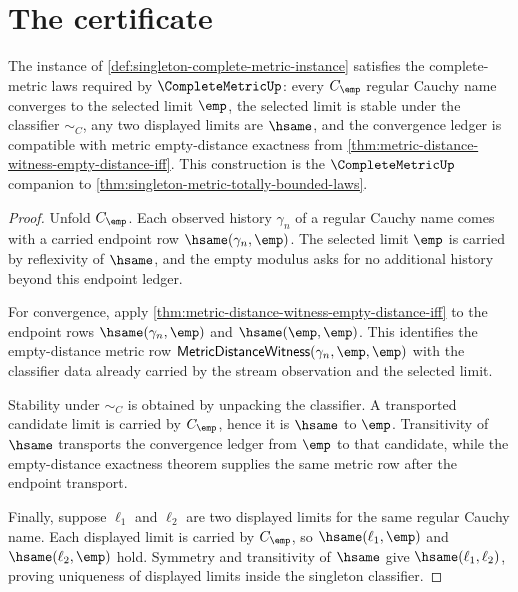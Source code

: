 \section{The certificate}
\label{sec:completemetric-certificate}

\begin{theorem}
\label{thm:singleton-complete-metric-laws}
The instance of \autoref{def:singleton-complete-metric-instance} satisfies the
complete-metric laws required by $\CompleteMetricUp$: every $C_{\emp}$ regular
Cauchy name converges to the selected limit $\emp$, the selected limit is
stable under the classifier $\sim_C$, any two displayed limits are $\hsame$,
and the convergence ledger is compatible with metric empty-distance exactness
from \autoref{thm:metric-distance-witness-empty-distance-iff}. This
construction is the $\CompleteMetricUp$ companion to
\autoref{thm:singleton-metric-totally-bounded-laws}.
\end{theorem}
\begin{proof}
Unfold $C_{\emp}$. Each observed history $\gamma_n$ of a regular Cauchy name
comes with a carried endpoint row $\hsame(\gamma_n,\emp)$. The selected limit
$\emp$ is carried by reflexivity of $\hsame$, and the empty modulus asks for no
additional history beyond this endpoint ledger.

For convergence, apply
\autoref{thm:metric-distance-witness-empty-distance-iff} to the endpoint rows
$\hsame(\gamma_n,\emp)$ and $\hsame(\emp,\emp)$. This identifies the
empty-distance metric row
$\mathsf{MetricDistanceWitness}(\gamma_n,\emp,\emp)$ with the classifier data
already carried by the stream observation and the selected limit.

Stability under $\sim_C$ is obtained by unpacking the classifier. A transported
candidate limit is carried by $C_{\emp}$, hence it is $\hsame$ to $\emp$.
Transitivity of $\hsame$ transports the convergence ledger from $\emp$ to that
candidate, while the empty-distance exactness theorem supplies the same
metric row after the endpoint transport.

Finally, suppose $\ell_1$ and $\ell_2$ are two displayed limits for the same
regular Cauchy name. Each displayed limit is carried by $C_{\emp}$, so
$\hsame(\ell_1,\emp)$ and $\hsame(\ell_2,\emp)$ hold. Symmetry and transitivity
of $\hsame$ give $\hsame(\ell_1,\ell_2)$, proving uniqueness of displayed
limits inside the singleton classifier.
\end{proof}

